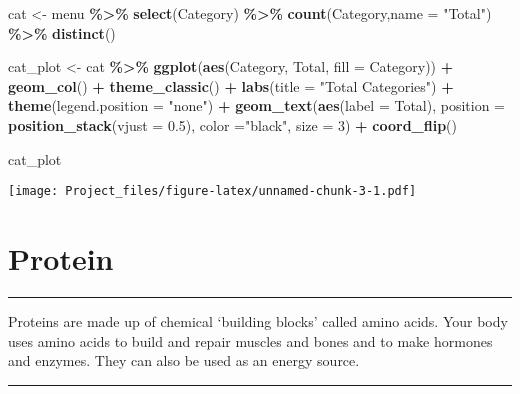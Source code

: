 \documentclass[
]{article}
\newenvironment{Shaded}{\begin{snugshade}}{\end{snugshade}}
\newcommand{\AttributeTok}[1]{\textcolor[rgb]{0.13,0.29,0.53}{#1}}
\newcommand{\DecValTok}[1]{\textcolor[rgb]{0.00,0.00,0.81}{#1}}
\newcommand{\FloatTok}[1]{\textcolor[rgb]{0.00,0.00,0.81}{#1}}
\newcommand{\FunctionTok}[1]{\textcolor[rgb]{0.13,0.29,0.53}{\textbf{#1}}}
\newcommand{\NormalTok}[1]{#1}
\newcommand{\OtherTok}[1]{\textcolor[rgb]{0.56,0.35,0.01}{#1}}
\newcommand{\SpecialCharTok}[1]{\textcolor[rgb]{0.81,0.36,0.00}{\textbf{#1}}}
\newcommand{\StringTok}[1]{\textcolor[rgb]{0.31,0.60,0.02}{#1}}
\begin{document}
\begin{Shaded}
\begin{Highlighting}[]
\NormalTok{cat }\OtherTok{\textless{}{-}}\NormalTok{ menu }\SpecialCharTok{\%\textgreater{}\%} 
  \FunctionTok{select}\NormalTok{(Category) }\SpecialCharTok{\%\textgreater{}\%} 
  \FunctionTok{count}\NormalTok{(Category,}\AttributeTok{name =} \StringTok{"Total"}\NormalTok{)  }\SpecialCharTok{\%\textgreater{}\%} 
  \FunctionTok{distinct}\NormalTok{()}

\NormalTok{cat\_plot }\OtherTok{\textless{}{-}}\NormalTok{ cat }\SpecialCharTok{\%\textgreater{}\%} 
  \FunctionTok{ggplot}\NormalTok{(}\FunctionTok{aes}\NormalTok{(Category,}
\NormalTok{             Total,}
             \AttributeTok{fill =}\NormalTok{ Category)) }\SpecialCharTok{+} 
  \FunctionTok{geom\_col}\NormalTok{() }\SpecialCharTok{+} 
  \FunctionTok{theme\_classic}\NormalTok{() }\SpecialCharTok{+} 
  \FunctionTok{labs}\NormalTok{(}\AttributeTok{title =} \StringTok{"Total Categories"}\NormalTok{) }\SpecialCharTok{+} 
  \FunctionTok{theme}\NormalTok{(}\AttributeTok{legend.position =} \StringTok{"none"}\NormalTok{) }\SpecialCharTok{+} 
  \FunctionTok{geom\_text}\NormalTok{(}\FunctionTok{aes}\NormalTok{(}\AttributeTok{label =}\NormalTok{ Total), }
            \AttributeTok{position =} \FunctionTok{position\_stack}\NormalTok{(}\AttributeTok{vjust =} \FloatTok{0.5}\NormalTok{),}
            \AttributeTok{color =}\StringTok{"black"}\NormalTok{, }\AttributeTok{size =} \DecValTok{3}\NormalTok{) }\SpecialCharTok{+} \FunctionTok{coord\_flip}\NormalTok{()}


\NormalTok{cat\_plot}
\end{Highlighting}
\end{Shaded}

\texttt{[image: Project\_files/figure-latex/unnamed-chunk-3-1.pdf]}

\hypertarget{protein}{%
\section{Protein}\label{protein}}

\begin{center}\rule{0.5\linewidth}{0.5pt}\end{center}

Proteins are made up of chemical `building blocks' called amino acids.
Your body uses amino acids to build and repair muscles and bones and to
make hormones and enzymes. They can also be used as an energy source.

\begin{center}\rule{0.5\linewidth}{0.5pt}\end{center}
\end{document}
